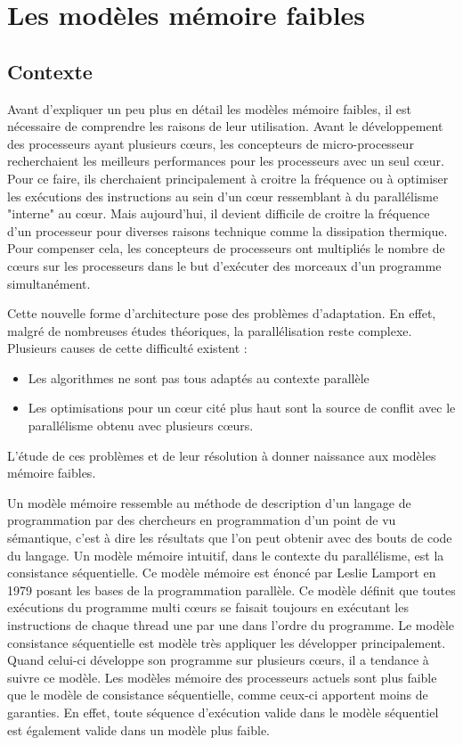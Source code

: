\documentclass[12pt,a4paper]{article}
\begin{document}

\section{Les modèles mémoire faibles}

\subsection{Contexte}

Avant d'expliquer un peu plus en détail les modèles mémoire faibles, il est nécessaire de comprendre les raisons de leur utilisation. Avant le développement des processeurs ayant plusieurs cœurs, les concepteurs de micro-processeur recherchaient les meilleurs performances pour les processeurs avec un seul cœur. Pour ce faire, ils cherchaient principalement à croitre la fréquence ou à optimiser les exécutions des instructions au sein d'un cœur ressemblant à du parallélisme "interne" au cœur. Mais aujourd'hui, il devient difficile de croitre la fréquence d'un processeur pour diverses raisons technique comme la dissipation thermique. Pour compenser cela, les concepteurs de processeurs ont multipliés le nombre de cœurs sur les processeurs dans le but d'exécuter des morceaux d'un programme simultanément.

Cette nouvelle forme d'architecture pose des problèmes d'adaptation. En effet, malgré de nombreuses études théoriques, la parallélisation reste complexe. Plusieurs causes de cette difficulté existent :
\begin{itemize}
	\item Les algorithmes ne sont pas tous adaptés au contexte parallèle
	\item Les optimisations pour un cœur cité plus haut sont la source de conflit avec le parallélisme obtenu avec plusieurs cœurs. 
\end{itemize}
L'étude de ces problèmes et de leur résolution à donner naissance aux modèles mémoire faibles.

Un modèle mémoire ressemble au méthode de description d'un langage de programmation par des chercheurs en programmation d'un point de vu sémantique, c'est à dire les résultats que l'on peut obtenir avec des bouts de code du langage. Un modèle mémoire intuitif, dans le contexte du parallélisme, est la consistance séquentielle. Ce modèle mémoire est énoncé par Leslie Lamport en 1979 posant les bases de la programmation parallèle. Ce modèle définit que toutes exécutions du programme multi cœurs se faisait toujours en exécutant les instructions de chaque thread une par une dans l'ordre du programme. Le modèle  consistance séquentielle est modèle très appliquer les développer principalement. Quand celui-ci développe son programme sur plusieurs cœurs, il a tendance à suivre ce modèle. Les modèles mémoire des processeurs actuels sont plus faible que le modèle de consistance séquentielle, comme ceux-ci apportent moins de garanties. En effet, toute séquence d'exécution valide dans le modèle séquentiel est également valide dans un modèle plus faible.
\end{document}
